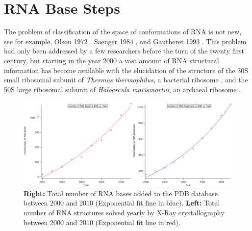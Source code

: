 \chapter{RNA Base Steps}
\label{basesteps} 

The problem of classification of the space of conformations
of RNA  is not  new, see for  example, Olson  1972 \cite{olson1_1972},
Saenger     1984     \cite{saenger1984},     and    Gautheret     1993
\cite{gautheret1993}.  This  problem had only been addressed  by a few
researchers before the turn of  the twenty first century, but starting
in  the year  2000 a  vast amount  of RNA  structural  information has
become  available with  the elucidation  of the  structure of  the 30S
small ribosomal subunit  of \textit{Thermus thermophilus}, a bacterial
ribosome \cite{wimberly2000, schluenzen2000}, and the 50S large
ribosomal subunit of \textit{Haloarcula marismortui}, an archaeal
ribosome \cite{ban2000}.
\begin{figure}[H]
\centering
\includegraphics[scale=0.38]{Chapter2/rna2000_2009copy.png}
\caption{\textbf{Right:} Total  number of RNA  bases added to  the PDB
database  between 2000 and  2010 (Exponential fit line in
blue). \textbf{Left:}  Total number  of RNA structures  solved yearly
by X-Ray  crystallography between  2000 and 2010 (Exponential fit line
in red).}
\label{fig:rnainpdb}
\end{figure}

